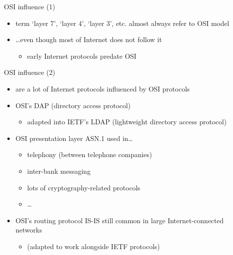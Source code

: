 \begin{frame}{OSI influence (1)}
    \begin{itemize}
    \item term `layer 7', `layer 4', `layer 3', etc. almost always refer to OSI model
    \item \ldots even though most of Internet does not follow it
        \begin{itemize}
        \item early Internet protocols predate OSI
        \end{itemize}
    \end{itemize}
\end{frame}

\begin{frame}{OSI influence (2)}
    \begin{itemize}
    \item are a lot of Internet protocols influenced by OSI protocols
    \vspace{.5cm}
    \item OSI's DAP (directory access protocol) 
        \begin{itemize}
        \item adapted into IETF's LDAP (lightweight directory access protocol)
        \end{itemize}
    \item OSI presentation layer ASN.1 used in\ldots
        \begin{itemize}
        \item telephony (between telephone companies)
        \item inter-bank messaging
        \item lots of cryptography-related protocols
        \item \ldots
        \end{itemize}
    \item OSI's routing protocol IS-IS still common in large Internet-connected networks
        \begin{itemize}
        \item (adapted to work alongside IETF protocols)
        \end{itemize}
    \end{itemize}
\end{frame}

